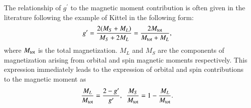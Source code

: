 \documentclass[preprint,12pt]{elsarticle}
\begin{document}
The relationship of $g^{\prime}$ to the magnetic moment contribution is often given in the literature following the example of Kittel\cite{Kittel1949} in the following form: \cite{Meyer1961, Smit1959}
\begin{equation}
g^{\prime}=\frac{2(M_{S}+M_{L})}{M_{S}+2M_{L}}=\frac{2M_{\rm tot}}{M_{\rm tot}+M_{L}},
\label{eq:gprime_approx}
\end{equation}
where $M_{\rm tot}$ is the total magnetization. $M_{L}$ and $M_{S}$  are the components of magnetization arising from orbital and spin magnetic moments respectively. This expression immediately leads to the expression of orbital and spin contributions to the magnetic moment as \cite{deBever1997}
\begin{equation}
\frac{M_{L}}{M_{\rm tot}}=\frac{2-g^{\prime}}{g^{\prime}}, ~~\frac{M_{S}}{M_{\rm tot}}=1-\frac{M_{L}}{M_{\rm tot}}.
\label{eq:frac_gprime_approx}
\end{equation}
\end{document}
